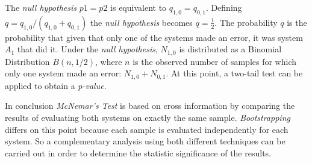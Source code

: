 The \textit{null hypothesis} $p1=p2$ is equivalent to $q_{1,0}=q_{0,1}$. Defining
$q=q_{1,0}/(q_{1,0}+q_{0,1})$ the \textit{null hypothesis} becomes $q=\frac{1}{2}$.
The probability $q$ is the probability that given that only one of the systems
made an error, it was system $A_{1}$ that did it. Under the \textit{null hypothesis},
$N_{1,0}$ is distributed as a Binomial Distribution $B(n,1/2)$, where $n$ is
the observed number of samples for which only one system made an error: $N_{1,0}+N_{0,1}$.
At this point, a two-tail test can be applied to obtain a \textit{p-value}.

In conclusion \textit{McNemar's Test} is based on cross information by comparing the results of
evaluating both systems on exactly the same sample. \textit{Bootstrapping} differs on this
point because each sample is evaluated independently for each system.
So a complementary analysis using both different techniques can be carried out
in order to determine the statistic significance of the results.

